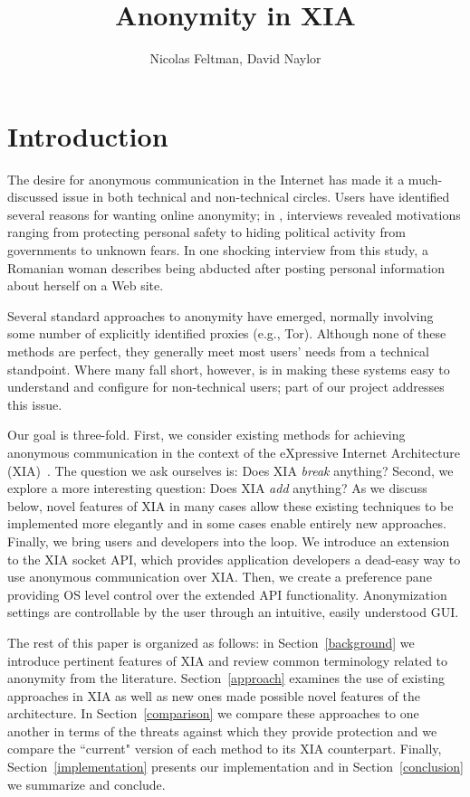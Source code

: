 \documentclass{article}
\title{Anonymity in XIA}
\author{Nicolas Feltman, David Naylor}
\begin{document}
\maketitle

\section{Introduction}
\label{introduction}
The desire for anonymous communication in the Internet has made it a much-discussed issue in both technical and non-technical circles. Users have identified several reasons for wanting online anonymity; in \cite{user-study}, interviews revealed motivations ranging from protecting personal safety to hiding political activity from governments to unknown fears. In one shocking interview from this study, a Romanian woman describes being abducted after posting personal information about herself on a Web site.

Several standard approaches to anonymity have emerged, normally involving some number of explicitly identified proxies (e.g., Tor). Although none of these methods are perfect, they generally meet most users' needs from a technical standpoint. Where many fall short, however, is in making these systems easy to understand and configure for non-technical users; part of our project addresses this issue.

Our goal is three-fold. First, we consider existing methods for achieving anonymous communication in the context of the eXpressive Internet Architecture (XIA)~\cite{xia}. The question we ask ourselves is: Does XIA {\em break} anything? Second, we explore a more interesting question: Does XIA {\em add} anything? As we discuss below, novel features of XIA in many cases allow these existing techniques to be implemented more elegantly and in some cases enable entirely new approaches. Finally, we bring users and developers into the loop. We introduce an extension to the XIA socket API, which provides application developers a dead-easy way to use anonymous communication over XIA. Then, we create a preference pane providing OS level control over the extended API functionality. Anonymization settings are controllable by the user through an intuitive, easily understood GUI.

The rest of this paper is organized as follows: in Section~\ref{background} we introduce pertinent features of XIA and review common terminology related to anonymity from the literature. Section~\ref{approach} examines the use of existing approaches in XIA as well as new ones made possible novel features of the architecture. In Section~\ref{comparison} we compare these approaches to one another in terms of the threats against which they provide protection and we compare the ``current" version of each method to its XIA counterpart. Finally, Section~\ref{implementation} presents our implementation and in Section~\ref{conclusion} we summarize and conclude.
\end{document}
